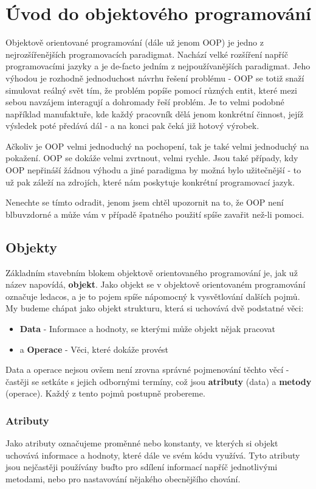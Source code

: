 \chapter{Úvod do objektového programování}
Objektově orientované programování (dále už jenom OOP) je jedno z nejrozšířenějších programovacích paradigmat. Nachází velké rozšíření napříč programovacími jazyky a je de-facto jedním z nejpoužívanějších paradigmat. Jeho výhodou je rozhodně jednoduchost návrhu řešení problému - OOP se totiž snaží simulovat reálný svět tím, že problém popíše pomocí různých entit, které mezi sebou navzájem interagují a dohromady řeší problém. Je to velmi podobné například manufaktuře, kde každý pracovník dělá jenom konkrétní činnost, jejíž výsledek poté předává dál - a na konci pak čeká již hotový výrobek.

Ačkoliv je OOP velmi jednoduchý na pochopení, tak je také velmi jednoduchý na pokažení. OOP se dokáže velmi zvrtnout, velmi rychle. Jsou také případy, kdy OOP nepřináší žádnou výhodu a jiné paradigma by možná bylo užitečnější - to už pak záleží na zdrojích, které nám poskytuje konkrétní programovací jazyk.

Nenechte se tímto odradit, jenom jsem chtěl upozornit na to, že OOP není blbuvzdorné a může vám v případě špatného použití spíše zavařit než-li pomoci.

\section{Objekty}
Základním stavebním blokem objektově orientovaného programování je, jak už název napovídá, \textbf{objekt}. Jako objekt se v objektově orientovaném programování označuje ledacos, a je to pojem spíše nápomocný k vysvětlování dalších pojmů. My budeme chápat jako objekt strukturu, která si uchovává dvě podstatné věci:

\begin{itemize}
	\item \textbf{Data} - Informace a hodnoty, se kterými může objekt nějak pracovat
	\item a \textbf{Operace} - Věci, které dokáže provést
\end{itemize}

Data a operace nejsou ovšem není zrovna správné pojmenování těchto věcí - častěji se setkáte s jejich odbornými termíny, což jsou \textbf{atributy} (data) a \textbf{metody} (operace). Každý z tento pojmů postupně probereme.

\subsection{Atributy}
Jako atributy označujeme proměnné nebo konstanty, ve kterých si objekt uchovává informace a hodnoty, které dále ve svém kódu využívá. Tyto atributy jsou nejčastěji používány buďto pro sdílení informací napříč jednotlivými metodami, nebo pro nastavování nějakého obecnějšího chování.

